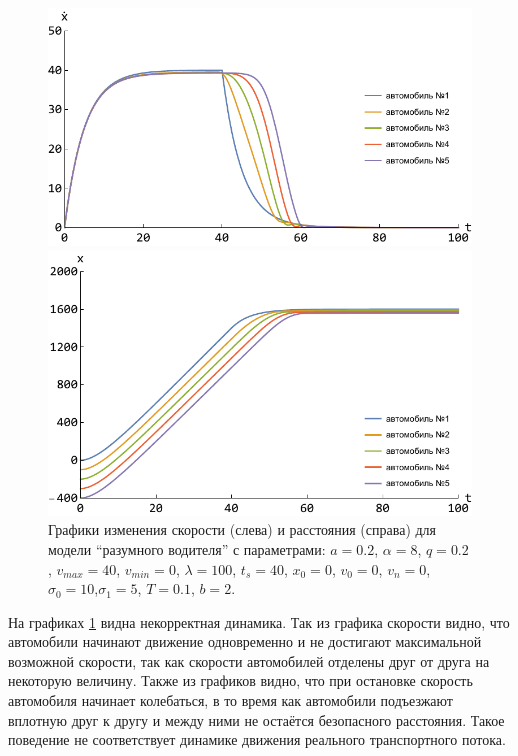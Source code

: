 \documentclass[12pt, a4paper]{extarticle}
\numberwithin{equation}{section}
\numberwithin{figure}{section}
\begin{document}
\begin{figure}[h!]
	\begin{center}
		\begin{minipage}[h!]{0.48\linewidth}
			\includegraphics[width=1\linewidth,height=0.2\textheight]
			{Images/treiber_model_speed.pdf}
		\end{minipage}
		\hfill 
		\begin{minipage}[h!]{0.48\linewidth}
			\includegraphics[width=1\linewidth,height=0.2\textheight]
			{Images/treiber_model_distance.pdf}
		\end{minipage}
		\caption{Графики изменения скорости (слева) и расстояния (справа) для модели ``разумного водителя'' с параметрами: $a=0.2$, $\alpha=8$, $q=0.2$, $v_{max}=40$, $v_{min}=0$, $\lambda=100$, $t_s=40$, $x_0=0$, $v_0=0$, $v_n=0$, $\sigma_0=10$,$\sigma_1=5$, $T=0.1$, $b=2$. }
		\label{treiber_model_img}
	\end{center}
\end{figure}

На графиках \ref{treiber_model_img} видна некорректная динамика. Так из графика скорости видно, что автомобили начинают движение одновременно и не достигают максимальной возможной скорости, так как скорости автомобилей отделены друг от друга на некоторую величину. Также из графиков видно, что при остановке скорость автомобиля начинает колебаться, в то время как автомобили подъезжают вплотную друг к другу и между ними не остаётся безопасного расстояния. Такое поведение не соответствует динамике движения реального транспортного потока. 
\end{document}
